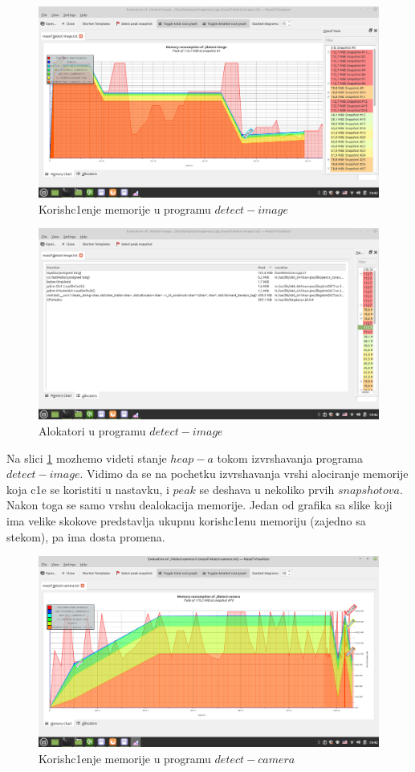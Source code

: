 \documentclass{article}
\begin{document}
\begin{figure}[H]
    \centering
    \includegraphics[width=12cm]{img/massif/massif_detect_image_memory.png}
    \caption{Korish\-c1enje memorije u programu $detect-image$}
    \label{dim:massif}
\end{figure}
\begin{figure}[H]
    \centering
    \includegraphics[width=12cm]{img/massif/massif_detect_image_allocators.png}
    \caption{Alokatori u programu $detect-image$}
    \label{dima:massif}
\end{figure}

Na slici \ref{dim:massif} mozhemo videti stanje $heap-a$ tokom izvrshavanja programa $detect-image$.  Vidimo da se na pochetku izvrshavanja vrshi alociranje memorije koja c1e se koristiti u nastavku, i $peak$ se deshava u nekoliko prvih $snapshotova.$ Nakon toga se samo vrshu dealokacija memorije. Jedan od grafika sa slike koji ima velike skokove predstavlja ukupnu korish\-c1enu memoriju (zajedno sa stekom), pa ima dosta promena.


\begin{figure}[H]
    \centering
    \includegraphics[width=12cm]{img/massif/massif_detect_camera_memory1.png}
    \caption{Korish\-c1enje memorije u programu $detect-camera$}
    \label{dcm:massif}
\end{figure}
\end{document}
